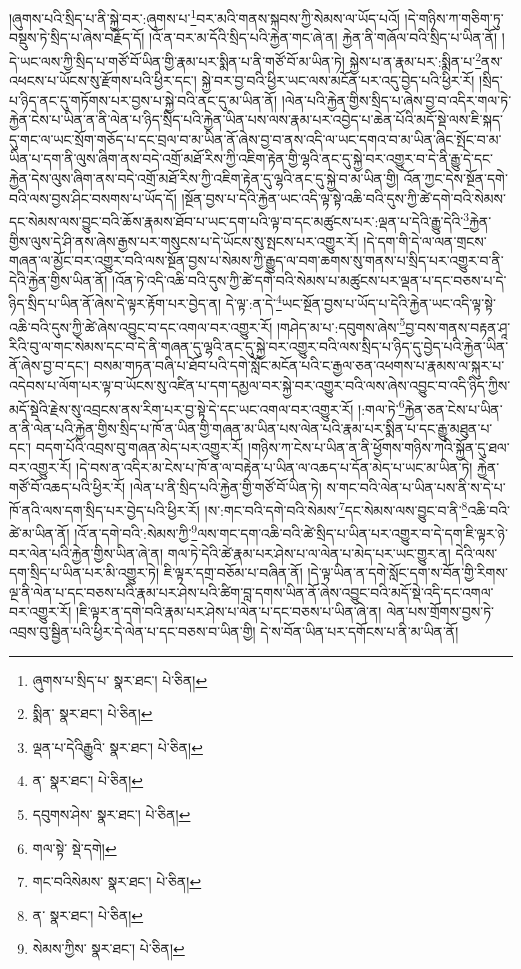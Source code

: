 །ཞུགས་པའི་སྲིད་པ་ནི་སྐྱེ་བར་:ཞུགས་པ་\footnote{ཞུགས་པ་སྲིད་པ་  སྣར་ཐང་།  པེ་ཅིན། }བར་མའི་གནས་སྐབས་ཀྱི་སེམས་ལ་ཡོད་པའོ། །དེ་གཉིས་ཀ་གཅིག་ཏུ་བསྡུས་ཏེ་སྲིད་པ་ཞེས་བརྗོད་དོ། །འོ་ན་བར་མ་དོའི་སྲིད་པའི་རྐྱེན་གང་ཞེ་ན། རྐྱེན་ནི་གཞོལ་བའི་སྲིད་པ་ཡིན་ནོ། །དེ་ཡང་ལས་ཀྱི་སྲིད་པ་གཙོ་བོ་ཡིན་གྱི་རྣམ་པར་སྨིན་པ་ནི་གཙོ་བོ་མ་ཡིན་ཏེ། སྐྱེས་པ་ན་རྣམ་པར་:སྨིན་པ་\footnote{སྨིན་  སྣར་ཐང་།  པེ་ཅིན། }ནས་འཕངས་པ་ཡོངས་སུ་རྫོགས་པའི་ཕྱིར་དང་། སྐྱེ་བར་བྱ་བའི་ཕྱིར་ཡང་ལས་མངོན་པར་འདུ་བྱེད་པའི་ཕྱིར་རོ། །སྲིད་པ་ཉིད་ནང་དུ་གཏོགས་པར་བྱས་པ་སྐྱེ་བའི་ནང་དུ་མ་ཡིན་ནོ། །ལེན་པའི་རྐྱེན་གྱིས་སྲིད་པ་ཞེས་བྱ་བ་འདིར་གལ་ཏེ་རྐྱེན་ངེས་པ་ཡིན་ན་ནི་ལེན་པ་ཉིད་སྲིད་པའི་རྐྱེན་ཡིན་པས་ལས་རྣམ་པར་འབྱེད་པ་ཆེན་པོའི་མདོ་སྡེ་ལས་ཇི་སྐད་དུ་གང་ལ་ཡང་སྲོག་གཅོད་པ་དང་བྲལ་བ་མ་ཡིན་ནོ་ཞེས་བྱ་བ་ནས་འདི་ལ་ཡང་དགའ་བ་མ་ཡིན་ཞིང་སྤོང་བ་མ་ཡིན་པ་དག་ནི་ལུས་ཞིག་ནས་བདེ་འགྲོ་མཐོ་རིས་ཀྱི་འཇིག་རྟེན་གྱི་ལྷའི་ནང་དུ་སྐྱེ་བར་འགྱུར་བ་དེ་ནི་རྒྱུ་དེ་དང་རྐྱེན་དེས་ལུས་ཞིག་ནས་བདེ་འགྲོ་མཐོ་རིས་ཀྱི་འཇིག་རྟེན་དུ་ལྷའི་ནང་དུ་སྐྱེ་བ་མ་ཡིན་གྱི། འོན་ཀྱང་དེས་སྔོན་དགེ་བའི་ལས་བྱས་ཤིང་བསགས་པ་ཡོད་དོ། །སྔོན་བྱས་པ་དེའི་རྐྱེན་ཡང་འདི་ལྟ་སྟེ་འཆི་བའི་དུས་ཀྱི་ཚེ་དགེ་བའི་སེམས་དང་སེམས་ལས་བྱུང་བའི་ཆོས་རྣམས་ཐོབ་པ་ཡང་དག་པའི་ལྟ་བ་དང་མཚུངས་པར་:ལྡན་པ་དེའི་རྒྱུ་དེའི་\footnote{ལྡན་པ་དེའིརྒྱུའི་  སྣར་ཐང་།  པེ་ཅིན། }རྐྱེན་གྱིས་ལུས་དེ་ཤི་ནས་ཞེས་རྒྱས་པར་གསུངས་པ་དེ་ཡོངས་སུ་སྤངས་པར་འགྱུར་རོ། །དེ་དག་གི་དེ་ལ་ལན་གྲངས་གཞན་ལ་མྱོང་བར་འགྱུར་བའི་ལས་སྔོན་བྱས་པ་སེམས་ཀྱི་རྒྱུད་ལ་བག་ཆགས་སུ་གནས་པ་སྲིད་པར་འགྱུར་བ་ནི་དེའི་རྐྱེན་གྱིས་ཡིན་ནོ། །འོན་ཏེ་འདི་འཆི་བའི་དུས་ཀྱི་ཚེ་དགེ་བའི་སེམས་པ་མཚུངས་པར་ལྡན་པ་དང་བཅས་པ་དེ་ཉིད་སྲིད་པ་ཡིན་ནོ་ཞེས་དེ་ལྟར་རྟོག་པར་བྱེད་ན། དེ་ལྟ་:ན་དེ་\footnote{ན་  སྣར་ཐང་།  པེ་ཅིན། }ཡང་སྔོན་བྱས་པ་ཡོད་པ་དེའི་རྐྱེན་ཡང་འདི་ལྟ་སྟེ་འཆི་བའི་དུས་ཀྱི་ཚེ་ཞེས་འབྱུང་བ་དང་འགལ་བར་འགྱུར་རོ། །གཤེད་མ་པ་:དབུགས་ཞེས་\footnote{དབུགས་ཤེས་  སྣར་ཐང་།  པེ་ཅིན། }བྱ་བས་གནས་བརྟན་ཤཱ་རིའི་བུ་ལ་གང་སེམས་དང་བ་དེ་ནི་གཞན་དུ་ལྷའི་ནང་དུ་སྐྱེ་བར་འགྱུར་བའི་ལས་སྲིད་པ་ཉིད་དུ་བྱེད་པའི་རྐྱེན་ཡིན་ནོ་ཞེས་བྱ་བ་དང་། བསམ་གཏན་བཞི་པ་ཐོབ་པའི་དགེ་སློང་མངོན་པའི་ང་རྒྱལ་ཅན་འཕགས་པ་རྣམས་ལ་སྐུར་པ་འདེབས་པ་ལོག་པར་ལྟ་བ་ཡོངས་སུ་འཛིན་པ་དག་དམྱལ་བར་སྐྱེ་བར་འགྱུར་བའི་ལས་ཞེས་འབྱུང་བ་འདི་ཉིད་ཀྱིས་མདོ་སྡེའི་རྗེས་སུ་འབྲངས་ནས་རིག་པར་བྱ་སྟེ་དེ་དང་ཡང་འགལ་བར་འགྱུར་རོ། །:གལ་ཏེ་\footnote{གལ་སྟེ་  སྡེ་དགེ། }རྐྱེན་ཅན་ངེས་པ་ཡིན་ན་ནི་ལེན་པའི་རྐྱེན་གྱིས་སྲིད་པ་ཁོ་ན་ཡིན་གྱི་གཞན་མ་ཡིན་པས་ལེན་པའི་རྣམ་པར་སྨིན་པ་དང་རྒྱུ་མཐུན་པ་དང་། བདག་པོའི་འབྲས་བུ་གཞན་མེད་པར་འགྱུར་རོ། །གཉིས་ཀ་ངེས་པ་ཡིན་ན་ནི་ཕྱོགས་གཉིས་ཀའི་སྐྱོན་དུ་ཐལ་བར་འགྱུར་རོ། །དེ་བས་ན་འདིར་མ་ངེས་པ་ཁོ་ན་ལ་བརྟེན་པ་ཡིན་ལ་འཆད་པ་དོན་མེད་པ་ཡང་མ་ཡིན་ཏེ། རྐྱེན་གཙོ་བོ་འཆད་པའི་ཕྱིར་རོ། །ལེན་པ་ནི་སྲིད་པའི་རྐྱེན་གྱི་གཙོ་བོ་ཡིན་ཏེ། ས་གང་བའི་ལེན་པ་ཡིན་པས་ནི་ས་དེ་པ་ཁོ་ནའི་ལས་དག་སྲིད་པར་བྱེད་པའི་ཕྱིར་རོ། །ས་:གང་བའི་དགེ་བའི་སེམས་\footnote{གང་བའིསེམས་  སྣར་ཐང་།  པེ་ཅིན། }དང་སེམས་ལས་བྱུང་བ་ནི་\footnote{ན་  སྣར་ཐང་།  པེ་ཅིན། }འཆི་བའི་ཚེ་མ་ཡིན་ནོ། །འོ་ན་དགེ་བའི་:སེམས་ཀྱི་\footnote{སེམས་ཀྱིས་  སྣར་ཐང་།  པེ་ཅིན། }ལས་གང་དག་འཆི་བའི་ཚེ་སྲིད་པ་ཡིན་པར་འགྱུར་བ་དེ་དག་ཇི་ལྟར་ཉེ་བར་ལེན་པའི་རྐྱེན་གྱིས་ཡིན་ཞེ་ན། གལ་ཏེ་དེའི་ཚེ་རྣམ་པར་ཤེས་པ་ལ་ལེན་པ་མེད་པར་ཡང་གྱུར་ན། དེའི་ལས་དག་སྲིད་པ་ཡིན་པར་མི་འགྱུར་ཏེ། ཇི་ལྟར་དགྲ་བཅོམ་པ་བཞིན་ནོ། །དེ་ལྟ་ཡིན་ན་དགེ་སློང་དག་ས་བོན་གྱི་རིགས་ལྔ་ནི་ལེན་པ་དང་བཅས་པའི་རྣམ་པར་ཤེས་པའི་ཚིག་བླ་དགས་ཡིན་ནོ་ཞེས་འབྱུང་བའི་མདོ་སྡེ་འདི་དང་འགལ་བར་འགྱུར་རོ། །ཇི་ལྟར་ན་དགེ་བའི་རྣམ་པར་ཤེས་པ་ལེན་པ་དང་བཅས་པ་ཡིན་ཞེ་ན། ལེན་པས་གྲོགས་བྱས་ཏེ་འབྲས་བུ་སྦྱིན་པའི་ཕྱིར་དེ་ལེན་པ་དང་བཅས་བ་ཡིན་གྱི། དེ་ས་བོན་ཡིན་པར་དགོངས་པ་ནི་མ་ཡིན་ནོ། 